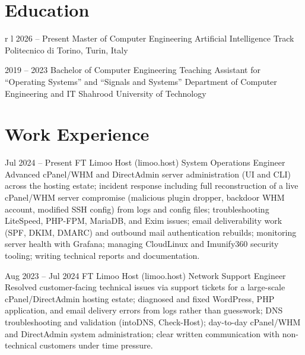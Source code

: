 \documentclass[
10pt, %
]{FreemanCV}
\begin{document}


	\section{Education}

	\begin{supertabular}{r l}
		\qualificationentry
		{2026 -- Present}
		{Master of Computer Engineering}
		{Artificial Intelligence Track}
		{}
		{Politecnico di Torino, Turin, Italy}

		\qualificationentry
		{2019 -- 2023}
		{Bachelor of Computer Engineering}
		{Teaching Assistant for “Operating Systems” and “Signals and Systems”}
		{Department of Computer Engineering and IT}
		{Shahrood University of Technology}
	\end{supertabular}

	\section{Work Experience}

	\jobentry
	{Jul 2024 -- Present}
	{FT}
	{Limoo Host (limoo.host)}
	{System Operations Engineer}
	{Advanced cPanel/WHM and DirectAdmin server administration (UI and CLI) across the hosting estate; incident response including full reconstruction of a live cPanel/WHM server compromise (malicious plugin dropper, backdoor WHM account, modified SSH config) from logs and config files; troubleshooting LiteSpeed, PHP-FPM, MariaDB, and Exim issues; email deliverability work (SPF, DKIM, DMARC) and outbound mail authentication rebuilds; monitoring server health with Grafana; managing CloudLinux and Imunify360 security tooling; writing technical reports and documentation.}

	\jobentry
	{Aug 2023 -- Jul 2024}
	{FT}
	{Limoo Host (limoo.host)}
	{Network Support Engineer}
	{Resolved customer-facing technical issues via support tickets for a large-scale cPanel/DirectAdmin hosting estate; diagnosed and fixed WordPress, PHP application, and email delivery errors from logs rather than guesswork; DNS troubleshooting and validation (intoDNS, Check-Host); day-to-day cPanel/WHM and DirectAdmin system administration; clear written communication with non-technical customers under time pressure.}
\end{document}
